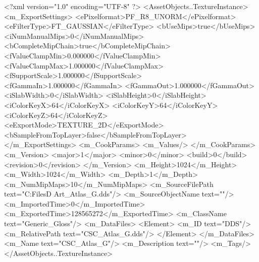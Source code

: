 <?xml version="1.0" encoding="UTF-8" ?>
<AssetObjects..TextureInstance>
	<m_ExportSettings>
		<ePixelformat>PF_R8_UNORM</ePixelformat>
		<eFilterType>FT_GAUSSIAN</eFilterType>
		<bUseMips>true</bUseMips>
		<iNumManualMips>0</iNumManualMips>
		<bCompleteMipChain>true</bCompleteMipChain>
		<fValueClampMin>0.000000</fValueClampMin>
		<fValueClampMax>1.000000</fValueClampMax>
		<fSupportScale>1.000000</fSupportScale>
		<fGammaIn>1.000000</fGammaIn>
		<fGammaOut>1.000000</fGammaOut>
		<iSlabWidth>0</iSlabWidth>
		<iSlabHeight>0</iSlabHeight>
		<iColorKeyX>64</iColorKeyX>
		<iColorKeyY>64</iColorKeyY>
		<iColorKeyZ>64</iColorKeyZ>
		<eExportMode>TEXTURE_2D</eExportMode>
		<bSampleFromTopLayer>false</bSampleFromTopLayer>
	</m_ExportSettings>
	<m_CookParams>
		<m_Values/>
	</m_CookParams>
	<m_Version>
		<major>1</major>
		<minor>0</minor>
		<build>0</build>
		<revision>0</revision>
	</m_Version>
	<m_Height>1024</m_Height>
	<m_Width>1024</m_Width>
	<m_Depth>1</m_Depth>
	<m_NumMipMaps>10</m_NumMipMaps>
	<m_SourceFilePath text="C:\Users\Shadow\Desktop\Working Files\3D Art\Textures\CSC_Atlas_G.dds"/>
	<m_SourceObjectName text=""/>
	<m_ImportedTime>0</m_ImportedTime>
	<m_ExportedTime>128565272</m_ExportedTime>
	<m_ClassName text="Generic_Gloss"/>
	<m_DataFiles>
		<Element>
			<m_ID text="DDS"/>
			<m_RelativePath text="CSC_Atlas_G.dds"/>
		</Element>
	</m_DataFiles>
	<m_Name text="CSC_Atlas_G"/>
	<m_Description text=""/>
	<m_Tags/>
</AssetObjects..TextureInstance>

